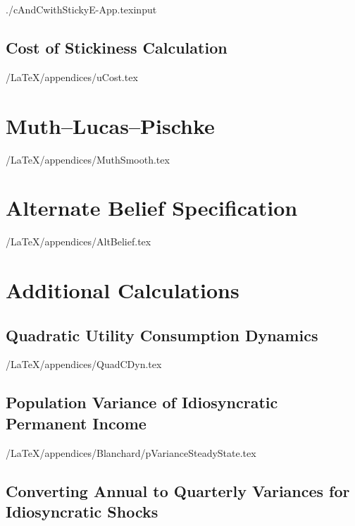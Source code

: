 \documentclass[titlepage]{\econtex}
\begin{document}
\begin{verbatimwrite}{./cAndCwithStickyE-App.texinput}
\subsection{Cost of Stickiness Calculation}\label{appendix:uCost}

\econtexRoot/LaTeX/appendices/uCost.tex


\hypertarget{How-MLP-Generates-Smoothness}{}
\section{Muth--Lucas--Pischke}

\econtexRoot/LaTeX/appendices/MuthSmooth.tex


\section{Alternate Belief Specification}\label{appendix:AltBelief}

\econtexRoot/LaTeX/appendices/AltBelief.tex


\section{Additional Calculations}

\subsection{Quadratic Utility Consumption Dynamics}\label{appendix:QuadCDyn}

\econtexRoot/LaTeX/appendices/QuadCDyn.tex




%



\subsection{Population Variance of Idiosyncratic Permanent Income}\label{appendix:pss}

\econtexRoot/LaTeX/appendices/Blanchard/pVarianceSteadyState.tex

\subsection{Converting Annual to Quarterly Variances for Idiosyncratic Shocks}\label{appendix:Ann2Qtr}


\end{verbatimwrite}
\end{document}

